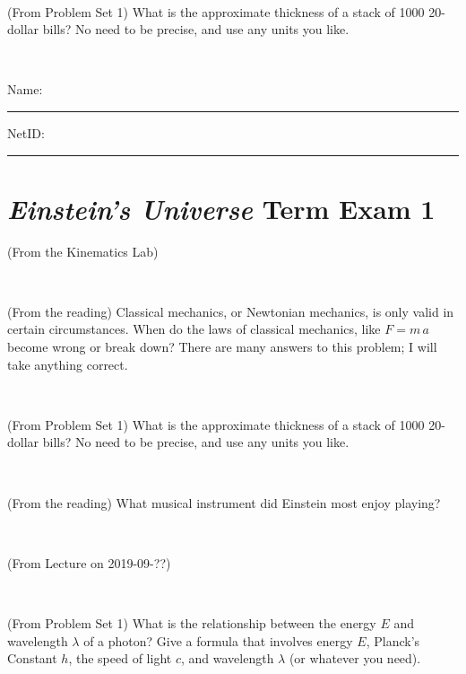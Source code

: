 \documentclass[12pt, letterpaper]{article}
\begin{document}
\vfill ~

\begin{problem} (From Problem Set 1)
What is the approximate thickness of a stack of 1000 20-dollar bills?
No need to be precise, and use any units you like.
\end{problem}


\vfill ~


\cleardoublepage



\noindent
Name: \rule[-1ex]{0.60\textwidth}{0.1pt}
NetID: \rule[-1ex]{0.20\textwidth}{0.1pt}

\section*{\textsl{Einstein's Universe} Term Exam 1}
\setcounter{problem}{1}


\begin{problem} (From the Kinematics Lab)

\end{problem}


\vfill ~

\begin{problem} (From the reading)
Classical mechanics, or Newtonian mechanics, is only valid in certain
circumstances. When do the laws of classical mechanics, like $F =
m\,a$ become wrong or break down? There are many answers to this
problem; I will take anything correct.
\end{problem}


\vfill ~

\begin{problem} (From Problem Set 1)
What is the approximate thickness of a stack of 1000 20-dollar bills?
No need to be precise, and use any units you like.
\end{problem}


\vfill ~

\begin{problem} (From the reading)
What musical instrument did Einstein most enjoy playing?
\end{problem}


\vfill ~


\clearpage


\begin{problem} (From Lecture on 2019-09-??)
\end{problem}


\vfill ~

\begin{problem} (From Problem Set 1)
What is the relationship between the energy $E$ and wavelength
$\lambda$ of a photon? Give a formula that involves energy $E$,
Planck's Constant $h$, the speed of light $c$, and wavelength
$\lambda$ (or whatever you need).
\end{problem}
\end{document}
